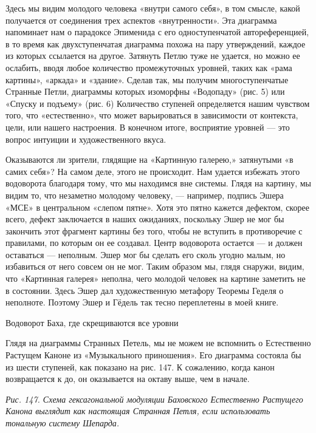 \documentclass[../main.tex]{subfiles}
\begin{document}
Здесь мы видим молодого человека «внутри самого себя», в том смысле, какой получается от соединения трех аспектов «внутренности». Эта диаграмма напоминает нам о парадоксе Эпименида с его одноступенчатой автореференцией, в то время как двухступенчатая диаграмма похожа на пару утверждений, каждое из которых ссылается на другое. Затянуть Петлю туже не удается, но можно ее ослабить, вводя любое количество промежуточных уровней, таких как «рама картины», «аркада» и «здание». Сделав так, мы получим многоступенчатые Странные Петли, диаграммы которых изоморфны «Водопаду» (рис. 5) или «Спуску и подъему» (рис. 6) Количество ступеней определяется нашим чувством того, что «естественно», что может варьироваться в зависимости от контекста, цели, или нашего настроения. В конечном итоге, восприятие уровней --- это вопрос интуиции и художественного вкуса.

Оказываются ли зрители, глядящие на «Картинную галерею,» затянутыми «в самих себя»? На самом деле, этого не происходит. Нам удается избежать этого водоворота благодаря тому, что мы находимся вне системы. Глядя на картину, мы видим то, что незаметно молодому человеку, --- например, подпись Эшера «МСЕ» в центральном «слепом пятне». Хотя это пятно кажется дефектом, скорее всего, дефект заключается в наших ожиданиях, поскольку Эшер не мог бы закончить этот фрагмент картины без того, чтобы не вступить в противоречие с правилами, по которым он ее создавал. Центр водоворота остается --- и должен оставаться --- неполным. Эшер мог бы сделать его сколь угодно малым, но избавиться от него совсем он не мог. Таким образом мы, глядя снаружи, видим, что «Картинная галерея» неполна, чего молодой человек на картине заметить не в состоянии. Здесь Эшер дал художественную метафору Теоремы Геделя о неполноте. Поэтому Эшер и Гёдель так тесно переплетены в моей книге.

Водоворот Баха, где скрещиваются все уровни

Глядя на диаграммы Странных Петель, мы не можем не вспомнить о Естественно Растущем Каноне из «Музыкального приношения». Его диаграмма состояла бы из шести ступеней, как показано на рис. 147. К сожалению, когда канон возвращается к до, он оказывается на октаву выше, чем в начале.

\emph{Рис. 147. Схема гексагональной модуляции Баховского Естественно Растущего Канона выглядит как настоящая Странная Петля, если использовать тональную систему Шепарда.}
\end{document}
